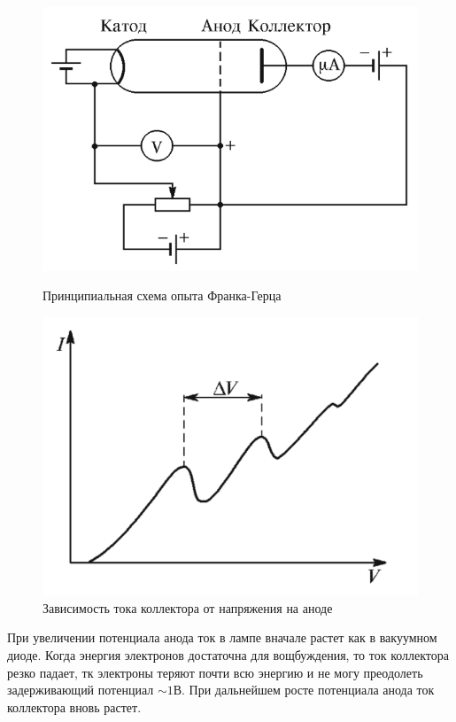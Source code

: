 \documentclass[a4paper]{article}
\begin{document}
\begin{figure}[h]
	\begin{center}
	\begin{minipage}[h]{0.45\linewidth}
	\includegraphics[width=1\linewidth]{p1.png}
	\caption{Принципиальная схема опыта Франка-Герца} 
	\label{p1}
	\end{minipage}
	\hfill 
	\begin{minipage}[h]{0.45\linewidth}
	\includegraphics[width=1\linewidth]{p2.png}
	\caption{Зависимость тока коллектора от напряжения на аноде}
	\label{p2}
	\end{minipage}
	\end{center}
\end{figure}

При увеличении потенциала анода ток в лампе вначале растет как в вакуумном диоде. Когда энергия электронов
достаточна для вощбуждения, то ток коллектора резко падает, тк электроны теряют почти всю энергию и 
не могу преодолеть задерживающий потенциал $\sim 1$В. При дальнейшем росте потенциала анода ток коллектора 
вновь растет.
\end{document}
